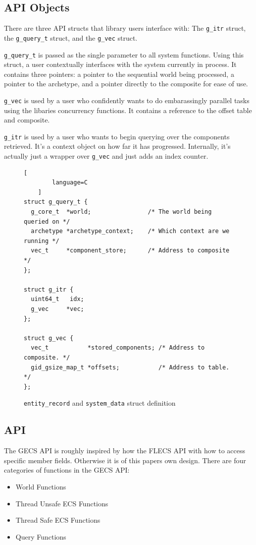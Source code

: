 \subsection{API Objects}
There are three API structs that library users interface with: The \texttt{g\_itr} struct, the \texttt{g\_query\_t} struct, and the \texttt{g\_vec} struct. 

\texttt{g\_query\_t} is passed as the single parameter to all system functions. Using this struct, a user contextually interfaces with the system currently in process. It contains three pointers: a pointer to the sequential world being processed, a pointer to the archetype, and a pointer directly to the composite for ease of use.

\texttt{g\_vec} is used by a user who confidently wants to do embarassingly parallel tasks using the libaries concurrency functions. It contains a reference to the offset table and composite.

\texttt{g\_itr} is used by a user who wants to begin querying over the components retrieved. It's a context object on how far it has progressed. Internally, it's actually just a wrapper over \texttt{g\_vec} and just adds an index counter.

\begin{figure}[htbp]
    \begin{lstlisting}[
        language=C
    ]
struct g_query_t {
  g_core_t  *world;                /* The world being queried on */
  archetype *archetype_context;    /* Which context are we running */
  vec_t     *component_store;      /* Address to composite */
};
        
struct g_itr {
  uint64_t   idx;
  g_vec     *vec;
};

struct g_vec {
  vec_t           *stored_components; /* Address to composite. */
  gid_gsize_map_t *offsets;           /* Address to table. */
};
    \end{lstlisting}
    \caption{\texttt{entity\_record} and \texttt{system\_data} struct definition}
    \label{code:apis}
\end{figure}

\subsection{API}
The GECS API is roughly inspired by how the FLECS API with how to access specific member fields. Otherwise it is of this papers own design. There are four categories of functions in the GECS API:
\begin{itemize}
    \item World Functions
    \item Thread Unsafe ECS Functions
    \item Thread Safe ECS Functions
    \item Query Functions
\end{itemize}

